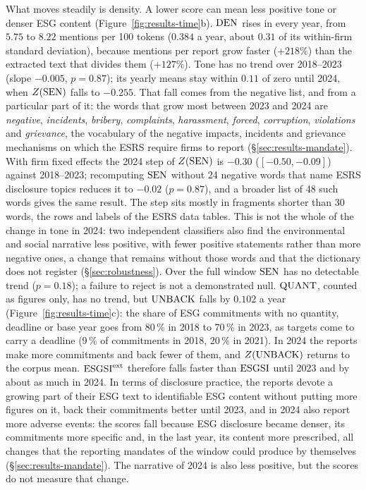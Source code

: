 What moves steadily is density. A lower score can mean less positive tone or denser ESG content
(Figure~\ref{fig:results-time}b). $\mathrm{DEN}$ rises in every year, from $5.75$ to $8.22$ mentions
per 100 tokens ($0.384$ a year, about $0.31$ of its within-firm standard deviation), because
mentions per report grow faster ($+218\%$) than the extracted text that divides them
($+127\%$). Tone has no trend over 2018--2023 (slope $-0.005$, $p = 0.87$); its yearly means stay
within $0.11$ of zero until 2024, when $Z(\mathrm{SEN})$ falls to $-0.255$. That fall comes from the
negative list, and from a particular part of it: the words that grow most between 2023 and 2024
are \emph{negative}, \emph{incidents}, \emph{bribery}, \emph{complaints}, \emph{harassment},
\emph{forced}, \emph{corruption}, \emph{violations} and \emph{grievance}, the vocabulary of the
negative impacts, incidents and grievance mechanisms on which the ESRS require firms to report
(\S\ref{sec:results-mandate}). With firm fixed effects the 2024 step of $Z(\mathrm{SEN})$ is $-0.30$
($[-0.50, -0.09]$) against 2018--2023; recomputing $\mathrm{SEN}$ without 24 negative words that name
ESRS disclosure topics reduces it to $-0.02$ ($p = 0.87$), and a broader list of 48 such words
gives the same result. The step sits mostly in fragments shorter than 30 words, the rows and
labels of the ESRS data tables. This is not the whole of the change in tone in 2024: two
independent classifiers also find the environmental and social narrative less positive, with
fewer positive statements rather than more negative ones, a change that remains without those
words and that the dictionary does not register (\S\ref{sec:robustness}). Over the full window
$\mathrm{SEN}$ has no detectable trend ($p = 0.18$); a failure to reject is not a demonstrated null.
$\mathrm{QUANT}$, counted as figures only, has no trend, but $\mathrm{UNBACK}$ falls by $0.102$ a year
(Figure~\ref{fig:results-time}c): the share of ESG commitments with no quantity, deadline or base
year goes from 80\,\% in 2018 to 70\,\% in 2023, as targets come to carry a deadline (9\,\% of
commitments in 2018, 20\,\% in 2021). In 2024 the reports make more commitments and back fewer of
them, and $Z(\mathrm{UNBACK})$ returns to the corpus mean. $\mathrm{ESGSI}^{\mathrm{ext}}$ therefore falls faster than
$\mathrm{ESGSI}$ until 2023 and by about as much in 2024. In terms of disclosure practice, the reports
devote a growing part of their ESG text to identifiable ESG content without putting more figures
on it, back their commitments better until 2023, and in 2024 also report more adverse events: the
scores fall because ESG disclosure became denser, its commitments more specific and, in the last
year, its content more prescribed, all changes that the reporting mandates of the window could
produce by themselves (\S\ref{sec:results-mandate}). The narrative of 2024 is also less positive, but the scores do not
measure that change.

